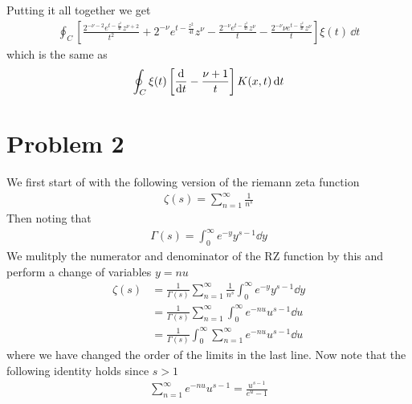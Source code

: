 \documentclass[a4paper,12pt]{article}
\begin{document}
Putting it all together we get 
\begin{equation}
	\begin{aligned}
		\oint_C  \left[\frac{2^{-\nu -2} e^{t-\frac{z^2}{4 t}} z^{\nu +2}}{t^2}+2^{-\nu } e^{t-\frac{z^2}{4 t}} z^{\nu }-\frac{2^{-\nu } e^{t-\frac{z^2}{4 t}} z^{\nu }}{t}-\frac{2^{-\nu } \nu  e^{t-\frac{z^2}{4 t}} z^{\nu }}{t}\right]\xi(t)\,\dd t
	\end{aligned}
\end{equation}
which is the same as 
\begin{equation}
	\begin{aligned}
			\oint_C  \xi(t)\left[\dv{}{t}-\frac{\nu+1}{t}\right]K(x,t)\,\dd t	
	\end{aligned}
\end{equation}
\section*{Problem 2}
We first start of with the following version of the riemann zeta function
\begin{equation}
	\begin{aligned}
		\zeta (s)=\sum_{n=1}^{\infty}\frac{1}{n^s}
	\end{aligned}
\end{equation}
Then noting that
\begin{equation}
	\begin{aligned}
		\Gamma(s)=\int_{0}^{\infty}e^{-y}y^{s-1}\dd y
	\end{aligned}
\end{equation}
We mulitply the numerator and denominator of the RZ function by this and perform a change of variables $y= nu$
\begin{equation}
	\begin{aligned}
		\zeta (s)&=\frac{1}{\Gamma(s)}\sum_{n=1}^{\infty}\frac{1}{n^s}\int_{0}^{\infty}e^{-y}y^{s-1}\dd y\\
		&=\frac{1}{\Gamma(s)}\sum_{n=1}^{\infty}\int_{0}^{\infty}e^{-nu}u^{s-1}\dd u\\
		&=\frac{1}{\Gamma(s)}\int_{0}^{\infty}\sum_{n=1}^{\infty}e^{-nu}u^{s-1}\dd u
	\end{aligned}
\end{equation}
where we have changed the order of the limits in the last line. Now note that the following identity holds since $s>1$
\begin{equation}
	\begin{aligned}
		\sum_{n=1}^{\infty} e^{-nu}u^{s-1}= \frac{u^{s-1}}{e^{u}-1}
	\end{aligned}
\end{equation}
\end{document}
